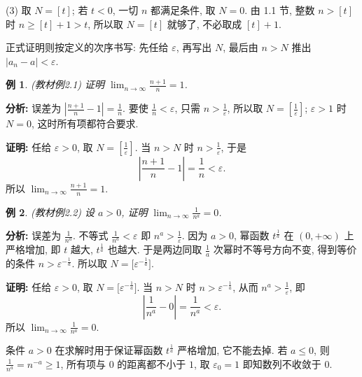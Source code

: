 \documentclass[UTF8,openany]{ctexbook}
\theoremstyle{chinesetextbook}
\newtheorem{example}{例}[section]
\newenvironment{cnproof}{\par\indent\textbf{证明:} \ignorespaces}{\par}
\begin{document}
(3) 取 $N=[t]$; 若 $t<0$, 一切 $n$ 都满足条件, 取 $N=0$. 由 1.1 节, 整数 $n>[t]$ 时 $n\ge[t]+1>t$, 所以取 $N=[t]$ 就够了, 不必取成 $[t]+1$.

正式证明则按定义的次序书写: 先任给 $\varepsilon$, 再写出 $N$, 最后由 $n>N$ 推出 $|a_n-a|<\varepsilon$.
\begin{example}\label{ex:2-1}
\textnormal{(教材例2.1)} 证明 $\displaystyle\lim_{n\to\infty}\frac{n+1}n=1$.
\end{example}
\par\indent\textbf{分析:} 误差为 $\displaystyle\left|\frac{n+1}n-1\right|=\frac1n$. 要使 $\displaystyle\frac1n<\varepsilon$, 只需 $\displaystyle n>\frac1\varepsilon$, 所以取 $\displaystyle N=\left[\frac1\varepsilon\right]$; $\varepsilon>1$ 时 $N=0$, 这时所有项都符合要求.
\begin{cnproof}
任给 $\varepsilon>0$, 取 $\displaystyle N=\left[\frac1\varepsilon\right]$. 当 $n>N$ 时 $\displaystyle n>\frac1\varepsilon$, 于是
\[
\left|\frac{n+1}n-1\right|=\frac1n<\varepsilon.
\]
所以 $\displaystyle\lim_{n\to\infty}\frac{n+1}n=1$.
\end{cnproof}
\begin{example}\label{ex:2-2}
\textnormal{(教材例2.2)} 设 $a>0$, 证明 $\displaystyle\lim_{n\to\infty}\frac1{n^a}=0$.
\end{example}
\par\indent\textbf{分析:} 误差为 $\displaystyle\frac1{n^a}$. 不等式 $\displaystyle\frac1{n^a}<\varepsilon$ 即 $\displaystyle n^a>\frac1\varepsilon$. 因为 $a>0$, 幂函数 $t^{\frac1a}$ 在 $(0,+\infty)$ 上严格增加, 即 $t$ 越大, $t^{\frac1a}$ 也越大. 于是两边同取 $\displaystyle\frac1a$ 次幂时不等号方向不变, 得到等价的条件 $n>\varepsilon^{-\frac1a}$. 所以取 $N=\bigl[\varepsilon^{-\frac1a}\bigr]$.
\begin{cnproof}
任给 $\varepsilon>0$, 取 $N=\bigl[\varepsilon^{-\frac1a}\bigr]$. 当 $n>N$ 时 $n>\varepsilon^{-\frac1a}$, 从而 $\displaystyle n^a>\frac1\varepsilon$, 即
\[
\left|\frac1{n^a}-0\right|=\frac1{n^a}<\varepsilon.
\]
所以 $\displaystyle\lim_{n\to\infty}\frac1{n^a}=0$.
\end{cnproof}
条件 $a>0$ 在求解时用于保证幂函数 $t^{\frac1a}$ 严格增加, 它不能去掉. 若 $a\le0$, 则 $\displaystyle\frac1{n^a}=n^{-a}\ge1$, 所有项与 $0$ 的距离都不小于 $1$, 取 $\varepsilon_0=1$ 即知数列不收敛于 $0$.
\end{document}
